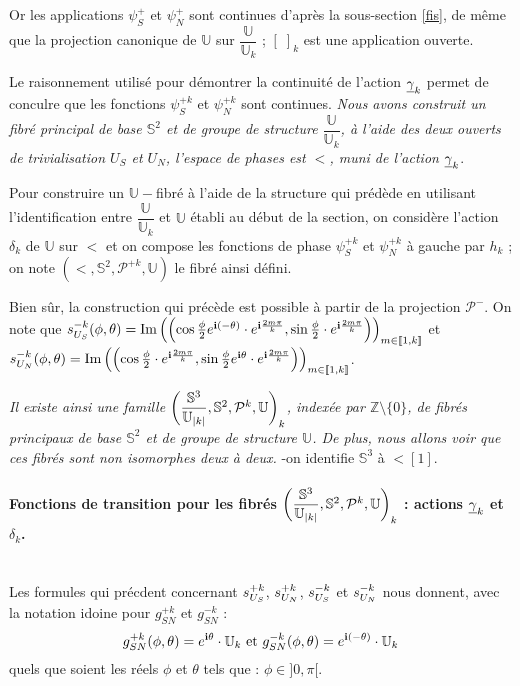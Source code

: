 \par
Or les applications $\psi_S^+$ et $\psi_N^+$ sont continues d'apr\`es la sous-section \ref{fis}, %
de m\^eme que la projection canonique de $\mathbb{U}$ sur $\dfrac{\mathbb{U}}{\mathbb{U}_k}$ ; %
$[\; ]_k$ est une application ouverte.
\par
Le raisonnement utilis\'e pour d\'emontrer la continuit\'e de l'action $\gk$ permet de conculre que les fonctions $\psi_S^{+k}$ et $\psi_N^{+k}$ sont continues.
\etoile
\emph{Nous avons construit un fibr\'e principal de base $\mathbb{S}^2$ et de groupe de structure $\dfrac{\mathbb{U}}{\mathbb{U}_k}$, %
\`a l'aide des deux ouverts de trivialisation $U_S$ et $U_N$, l'espace de phases est $\lt$, muni de l'action $\gk$}.

\par
Pour construire un $\mathbb{U}-$fibr\'e \`a l'aide de la structure qui pr\'ed\`ede en utilisant l'identification entre $\dfrac{\mathbb{U}}{\mathbb{U}_k}$ et $\mathbb{U}$ \'etabli au d\'ebut de la section, %
on consid\`ere l'action $\delta_k$ de $\mathbb{U}$ sur $\lt$ et on compose les fonctions de phase $\psi_S^{+k}$ et $\psi_N^{+k}$ \`a gauche par $h_k$ ; %
on note $\left(\lt ,\mathbb{S}^2,\mathcal{P}^{+k},\mathbb{U}\right)$ le fibr\'e ainsi d\'efini.

\ligneinter
Bien s\^ur, la construction qui pr\'ec\`ede est possible \`a partir de la projection $\mathcal{P}^-$. %
On note que $\se{S}{-k}(\phi,\theta)=\pla{\cos\frac{\phi}{2}\ec{(-\theta)}}{\sin\frac{\phi}{2}}$ %
et $\se{N}{-k}(\phi,\theta)=\pla{\cos\frac{\phi}{2}}{\sin\frac{\phi}{2}\ec{\theta}}$.

\par
\emph{Il existe ainsi une famille $\left(\lt[\abs{k}],\mathbb{S}^2,\mathcal{P}^k,\mathbb{U}\right)_k$, index\'ee par $\mathbb{Z}\setminus\{0\}$, de fibr\'es principaux de base $\mathbb{S}^2$ et de groupe de structure $\mathbb{U}$. %
De plus, nous allons voir que ces fibr\'es sont \emph{non isomorphes} deux \`a deux.} -on identifie $\mathbb{S}^3$ \`a $\lt[1]$.

\paragraph{Fonctions de transition pour les fibr\'es $\left(\lt[\abs{k}],\mathbb{S}^2,\mathcal{P}^k,\mathbb{U}\right)_k$ : actions $\gk$ et $\delta_k$.}~\\

Les formules qui pr\'ecdent concernant $\se{S}{+k}$, $\se{N}{+k}$, $\se{S}{-k}$ et $\se{N}{-k}$ nous donnent, avec la notation idoine pour $g_{SN}^{+k}$ et $g_{SN}^{-k}$ :
\[g_{SN}^{+k}(\phi ,\theta)=\ec{\theta}\cdot\mathbb{U}_k\text{ et }g_{SN}^{-k}(\phi ,\theta)=\ec{(-\theta)}\cdot\mathbb{U}_k\]
quels que soient les r\'eels $\phi$ et $\theta$ tels que : $\phi\in ]0,\pi[$.

